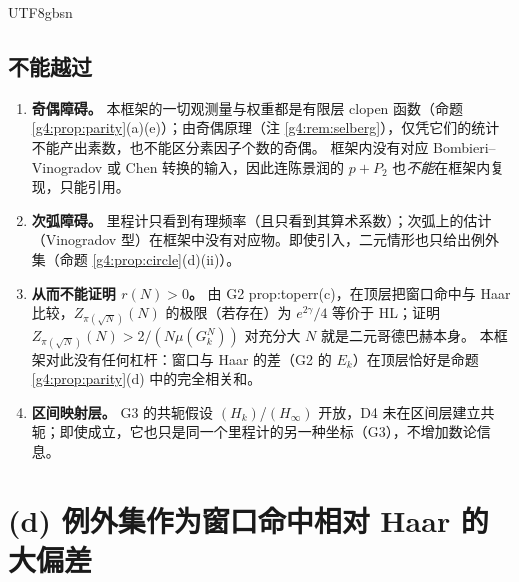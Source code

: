 \documentclass[11pt,a4paper]{article}
\newcommand{\Haar}{\mu}
\theoremstyle{plain}
\theoremstyle{definition}
\begin{document}
\begin{CJK}{UTF8}{gbsn}
\subsection{不能越过}
\begin{enumerate}[leftmargin=*]
\item \textbf{奇偶障碍。} 本框架的一切观测量与权重都是有限层 clopen 函数（命题 \ref{g4:prop:parity}(a)(e)）；由奇偶原理（注 \ref{g4:rem:selberg}），仅凭它们的统计不能产出素数，也不能区分素因子个数的奇偶。
框架内没有对应 Bombieri--Vinogradov 或 Chen 转换的输入，因此连陈景润的 $p+P_2$ 也\emph{不能}在框架内复现，只能引用。
\item \textbf{次弧障碍。} 里程计只看到有理频率（且只看到其算术系数）；次弧上的估计（Vinogradov 型）在框架中没有对应物。即使引入，二元情形也只给出例外集（命题 \ref{g4:prop:circle}(d)(ii)）。
\item \textbf{从而不能证明 $r(N)>0$。} 由 G2 prop:toperr(c)，在顶层把窗口命中与 Haar 比较，$Z_{\pi(\sqrt N)}(N)$ 的极限（若存在）为 $e^{2\gamma}/4$ 等价于 HL；证明 $Z_{\pi(\sqrt N)}(N)>2/(N\Haar(G_k^N))$ 对充分大 $N$ 就是二元哥德巴赫本身。
本框架对此没有任何杠杆：窗口与 Haar 的差（G2 的 $E_k$）在顶层恰好是命题 \ref{g4:prop:parity}(d) 中的完全相关和。
\item \textbf{区间映射层。} G3 的共轭假设 $(H_k)$/$(H_\infty)$ 开放，D4 未在区间层建立共轭；即使成立，它也只是同一个里程计的另一种坐标（G3），不增加数论信息。
\end{enumerate}

\section{(d) 例外集作为窗口命中相对 Haar 的大偏差}\label{g4:sec:ld}


\end{CJK}
\end{document}
